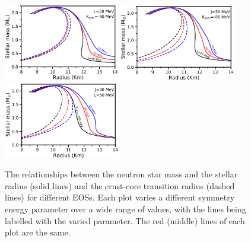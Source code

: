 \documentclass[fleqn,usenatbib]{mnras}
\begin{document}
\begin{figure}
\centering
\includegraphics[width=0.45\textwidth,angle=0]{MRs_Jvals_full.png}
\includegraphics[width=0.45\textwidth,angle=0]{MRs_Lvals_full.png}
\includegraphics[width=0.45\textwidth,angle=0]{MRs_Kvals_full.png}
\caption{The relationships between the neutron star mass and the stellar radius (solid lines) and the crust-core transition radius (dashed lines) for different EOSs. Each plot varies a different symmetry energy parameter over a wide range of values, with the lines being labelled with the varied parameter. The red (middle) lines of each plot are the same.}
\label{fig:MR_JLK}
\end{figure}
\end{document}
